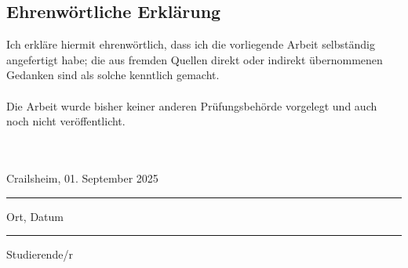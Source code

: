 \newpage

\subsection*{Ehrenwörtliche Erklärung}

Ich erkläre hiermit ehrenwörtlich, dass ich die vorliegende Arbeit selbständig angefertigt habe; die aus fremden Quellen direkt oder indirekt übernommenen Gedanken sind als solche kenntlich gemacht.\\ \\ 
Die Arbeit wurde bisher keiner anderen Prüfungsbehörde vorgelegt und auch noch nicht veröffentlicht.
\\ \\ \\
\parbox[t][][t]{5.5cm}{\centering Crailsheim, 01. September 2025 \hrule
\strut \centering\footnotesize Ort, Datum} \hfill
\parbox[t][][t]{5cm}{\hrule\strut \centering\footnotesize Studierende/r}
